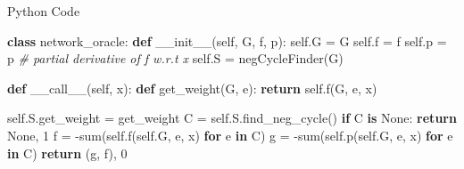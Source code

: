 \documentclass[
  ignorenonframetext,
  aspectratio=169,
  serif,onlymath]{beamer}
\newenvironment{Shaded}{}{}
\newcommand{\BuiltInTok}[1]{#1}
\newcommand{\CommentTok}[1]{\textcolor[rgb]{0.38,0.63,0.69}{\textit{#1}}}
\newcommand{\ControlFlowTok}[1]{\textcolor[rgb]{0.00,0.44,0.13}{\textbf{#1}}}
\newcommand{\DecValTok}[1]{\textcolor[rgb]{0.25,0.63,0.44}{#1}}
\newcommand{\FunctionTok}[1]{\textcolor[rgb]{0.02,0.16,0.49}{#1}}
\newcommand{\KeywordTok}[1]{\textcolor[rgb]{0.00,0.44,0.13}{\textbf{#1}}}
\newcommand{\NormalTok}[1]{#1}
\newcommand{\OperatorTok}[1]{\textcolor[rgb]{0.40,0.40,0.40}{#1}}
\newcommand{\VariableTok}[1]{\textcolor[rgb]{0.10,0.09,0.49}{#1}}
\begin{document}
\begin{frame}[fragile]{Python Code}
\protect\hypertarget{python-code}{}

\scriptsize

\begin{Shaded}
\begin{Highlighting}[]
\KeywordTok{class}\NormalTok{ network_oracle:}
    \KeywordTok{def} \FunctionTok{__init__}\NormalTok{(}\VariableTok{self}\NormalTok{, G, f, p):}
        \VariableTok{self}\NormalTok{.G }\OperatorTok{=}\NormalTok{ G}
        \VariableTok{self}\NormalTok{.f }\OperatorTok{=}\NormalTok{ f}
        \VariableTok{self}\NormalTok{.p }\OperatorTok{=}\NormalTok{ p  }\CommentTok{# partial derivative of f w.r.t x}
        \VariableTok{self}\NormalTok{.S }\OperatorTok{=}\NormalTok{ negCycleFinder(G)}

    \KeywordTok{def} \FunctionTok{__call__}\NormalTok{(}\VariableTok{self}\NormalTok{, x):}
        \KeywordTok{def}\NormalTok{ get_weight(G, e):}
            \ControlFlowTok{return} \VariableTok{self}\NormalTok{.f(G, e, x)}

        \VariableTok{self}\NormalTok{.S.get_weight }\OperatorTok{=}\NormalTok{ get_weight}
\NormalTok{        C }\OperatorTok{=} \VariableTok{self}\NormalTok{.S.find_neg_cycle()}
        \ControlFlowTok{if}\NormalTok{ C }\KeywordTok{is} \VariableTok{None}\NormalTok{:}
            \ControlFlowTok{return} \VariableTok{None}\NormalTok{, }\DecValTok{1}
\NormalTok{        f }\OperatorTok{=} \OperatorTok{-}\BuiltInTok{sum}\NormalTok{(}\VariableTok{self}\NormalTok{.f(}\VariableTok{self}\NormalTok{.G, e, x) }\ControlFlowTok{for}\NormalTok{ e }\KeywordTok{in}\NormalTok{ C)}
\NormalTok{        g }\OperatorTok{=} \OperatorTok{-}\BuiltInTok{sum}\NormalTok{(}\VariableTok{self}\NormalTok{.p(}\VariableTok{self}\NormalTok{.G, e, x) }\ControlFlowTok{for}\NormalTok{ e }\KeywordTok{in}\NormalTok{ C)}
        \ControlFlowTok{return}\NormalTok{ (g, f), }\DecValTok{0}
\end{Highlighting}
\end{Shaded}

\end{frame}
\end{document}
